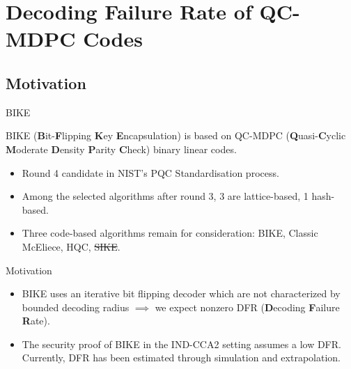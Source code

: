 \section{Decoding Failure Rate of QC-MDPC Codes}

\subsection{Motivation}

\begin{frame}{BIKE}

BIKE (\textbf{B}it-\textbf{F}lipping \textbf{K}ey \textbf{E}ncapsulation) is based on QC-MDPC (\textbf{Q}uasi-\textbf{C}yclic \textbf{M}oderate \textbf{D}ensity \textbf{P}arity \textbf{C}heck) binary linear codes.

\begin{itemize}
    \item Round 4 candidate in NIST's PQC Standardisation process.
    \item Among the selected algorithms after round 3, 3 are lattice-based, 1 hash-based.
    \item Three code-based algorithms remain for consideration: BIKE, Classic McEliece, HQC, \sout{SIKE}.
\end{itemize}
    
\end{frame}

\begin{frame}{Motivation}
\begin{itemize}
\item BIKE uses an iterative bit flipping decoder which are not characterized by bounded decoding radius $\implies$ we expect nonzero DFR (\textbf{D}ecoding \textbf{F}ailure \textbf{R}ate).
    \item The security proof of BIKE in the IND-CCA2 setting assumes a low DFR. Currently, DFR has been estimated through simulation and extrapolation.
\end{itemize}
\end{frame}

